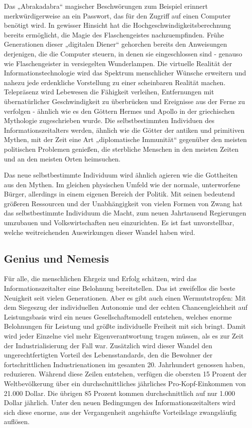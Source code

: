 \documentclass[
  a5paper,
  smalldemyvopaper,10pt,twoside,onecolumn,openright,extrafontsizes,hidelinks]{memoir}
\begin{document}
Das „Abrakadabra`` magischer Beschwörungen zum Beispiel erinnert
merkwürdigerweise an ein Passwort, das für den Zugriff auf einen
Computer benötigt wird. In gewisser Hinsicht hat die
Hochgeschwindigkeitsberechnung bereits ermöglicht, die Magie des
Flaschengeistes nachzuempfinden. Frühe Generationen dieser „digitalen
Diener`` gehorchen bereits den Anweisungen derjenigen, die die Computer
steuern, in denen sie eingeschlossen sind - genauso wie Flaschengeister
in versiegelten Wunderlampen. Die virtuelle Realität der
Informationstechnologie wird das Spektrum menschlicher Wünsche erweitern
und nahezu jede erdenkliche Vorstellung zu einer scheinbaren Realität
machen. Telepräsenz wird Lebewesen die Fähigkeit verleihen, Entfernungen
mit übernatürlicher Geschwindigkeit zu überbrücken und Ereignisse aus
der Ferne zu verfolgen - ähnlich wie es den Göttern Hermes und Apollo in
der griechischen Mythologie zugeschrieben wurde. Die selbstbestimmten
Individuen des Informationszeitalters werden, ähnlich wie die Götter der
antiken und primitiven Mythen, mit der Zeit eine Art „diplomatische
Immunität`` gegenüber den meisten politischen Problemen genießen, die
sterbliche Menschen in den meisten Zeiten und an den meisten Orten
heimsuchen.

Das neue selbstbestimmte Individuum wird ähnlich agieren wie die
Gottheiten aus den Mythen. Im gleichen physischen Umfeld wie der
normale, unterworfene Bürger, allerdings in einem eigenen Bereich der
Politik. Mit seinen bedeutend größeren Ressourcen und der Unabhängigkeit
von vielen Formen von Zwang hat das selbstbestimmte Individuum die
Macht, zum neuen Jahrtausend Regierungen umzubauen und Volkswirtschaften
neu einzurichten. Es ist fast unvorstellbar, welche weitreichenden
Auswirkungen dieser Wandel haben wird.

\subsection{Genius und Nemesis}\label{genius-und-nemesis}

Für alle, die menschlichen Ehrgeiz und Erfolg schätzen, wird das
Informationszeitalter eine Belohnung bereitstellen. Das ist zweifellos
die beste Neuigkeit seit vielen Generationen. Aber es gibt auch einen
Wermutstropfen: Mit dem Siegeszug der individuellen Autonomie und der
echten Chancengleichheit auf Leistungsbasis wird ein neues
Gesellschaftsmodell entstehen, welches enorme Belohnungen für Leistung
und größte individuelle Freiheit mit sich bringt. Damit wird jeder
Einzelne viel mehr Eigenverantwortung tragen müssen, als es zur Zeit der
Industrialisierung der Fall war. Zusätzlich wird dieser Wandel den
ungerechtfertigten Vorteil des Lebensstandards, den die Bewohner der
fortschrittlichen Industrienationen im gesamten 20. Jahrhundert genossen
haben, reduzieren. Während diese Zeilen entstehen, verfügen die obersten
15 Prozent der Weltbevölkerung über ein durchschnittliches jährliches
Pro-Kopf-Einkommen von 21.000 Dollar. Die übrigen 85 Prozent kommen
durchschnittlich auf nur 1.000 Dollar jährlich. Unter den neuen
Bedingungen des Informationszeitalters wird sich diese enorme, aus der
Vergangenheit angehäufte Vorteilslage zwangsläufig auflösen.
\end{document}
